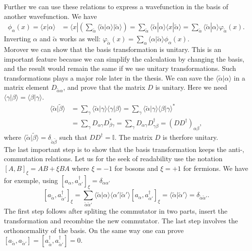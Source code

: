 \documentclass[../main.tex]{subfile}
\begin{document}
Further we can use these relations to express a wavefunction in the basis of another wavefunction. We have
\begin{align*}
    \phi_{\alpha}(x) = \langle x|\alpha\rangle &= \langle x|\left(\sum_{\tilde{\alpha}} \langle \tilde{\alpha}|\alpha\rangle |\tilde{\alpha}\rangle\right) = \sum_{\tilde{\alpha}}  \langle \tilde{\alpha}|\alpha\rangle\langle x|\tilde{\alpha}\rangle
    = \sum_{\tilde{\alpha}} \langle \tilde{\alpha}|\alpha\rangle \varphi_{\tilde{\alpha}}(x).
\end{align*}
Inverting $\alpha$ and $\tilde{\alpha}$ works as well: $\varphi_{\tilde{\alpha}}(x) = \sum_{\alpha} \langle \alpha|\tilde{\alpha}\rangle \phi_{\alpha}(x)$.\\

Morover we can show that the basis transformation is unitary. This is an important feature because we can simplify the calculation by changing the basis, and
the result would remain the same if we use unitary transformations. Such transformations plays a major role later in the thesis.
We can save the $\langle \tilde{\alpha} | \alpha\rangle$ in a matrix element $D_{\tilde{\alpha}\alpha}$, and prove that the matrix $D$ is unitary. Here we need
$\langle \gamma | \beta\rangle = \langle \beta | \gamma\rangle$.
\begin{align*}
    \langle \tilde{\alpha} | \tilde{\beta}\rangle  &= \sum_{\gamma} \langle \tilde{\alpha}|\gamma\rangle\langle \gamma | \beta\rangle =  \sum_{\gamma} \langle \tilde{\alpha}|\gamma\rangle \langle \beta | \gamma\rangle^{\ast}\\
    &=\sum_{\gamma} D_{\alpha\gamma}D_{\beta\gamma}^{\ast} = \sum_{\gamma} D_{\alpha\gamma}D^{\dagger}_{\gamma\beta} = (DD^{\dagger})_{\alpha\beta},
\end{align*} 
where $\langle \tilde{\alpha} | \tilde{\beta}\rangle = \delta_{\tilde{\alpha} \tilde{\beta}}$ such that $DD^{\dagger} = \mathbb{I}$. The matrix $D$ is therfore unitary.\\

The last important step is to show that the basis transformation keeps the anti-, commutation relations. Let us for the seek of readability
use the notation $[A,B]_{\xi} = AB + \xi BA$ where $\xi = -1$ for bosons and $\xi = +1$ for fermions. We have for exemple, using $[a_{\alpha}, a_{\alpha'}^{\dagger}]_{\xi} = \delta_{\alpha\alpha'}$
\[
    [a_{\tilde{\alpha}}, a_{\tilde{\alpha}'}^{\dagger}]_{\xi} = \sum_{\tilde{\alpha}\tilde{\alpha}'} \langle \tilde{\alpha}|\alpha\rangle\langle\alpha'|\tilde{\alpha}'\rangle [a_{\alpha}, a_{\alpha'}^{\dagger}]_{\xi} = \langle \tilde{\alpha}|\tilde{\alpha}'\rangle = \delta_{\tilde{\alpha}\tilde{\alpha}'}.
\]
The first step follows after spliting the commutator in two parts, insert the transformation and recombine the new commutator. 
The last step involves the orthonormality of the basis.
On the same way one can prove $[a_{\tilde{\alpha}},a_{\tilde{\alpha}'}] = [a_{\tilde{\alpha}}^{\dagger},a_{\tilde{\alpha}'}^{\dagger}] = 0$.
  
\end{document}

